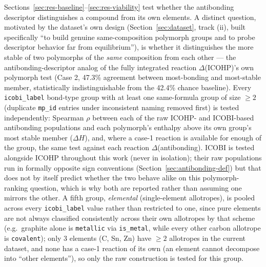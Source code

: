 \documentclass[journal=jpccck,manuscript=article]{achemso}
\begin{document}
Sections~\ref{sec:res-baseline}--\ref{sec:res-viability} test whether the
antibonding descriptor distinguishes a compound from its own elements. A
distinct question, motivated by the dataset's own design
(Section~\ref{sec:dataset}, track (ii), built specifically ``to build
genuine same-composition polymorph groups and to probe descriptor
behavior far from equilibrium''), is whether it distinguishes the more
stable of two polymorphs of the \emph{same} composition from each other
--- the antibonding-descriptor analog of the fully integrated reaction
$\Delta$(ICOHP)'s own polymorph test (Case 2, 47.3\% agreement between
most-bonding and most-stable member, statistically indistinguishable
from the 42.4\% chance baseline). Every \texttt{icobi\_label} bond-type
group with at least one same-formula group of size $\geq2$ (duplicate
\texttt{mp\_id} entries under inconsistent naming removed first) is
tested independently: Spearman $\rho$ between each of the raw ICOHP- and
ICOBI-based antibonding populations and each polymorph's enthalpy above
its own group's most stable member ($\Delta H$), and, where a case-1
reaction is available for enough of the group, the same test against
each reaction $\Delta$(antibonding). ICOBI is tested alongside ICOHP
throughout this work (never in isolation); their raw populations run in
formally opposite sign conventions (Section~\ref{sec:antibonding-def})
but that does not by itself predict whether the two behave alike on this
polymorph-ranking question, which is why both are reported rather than
assuming one mirrors the other. A fifth group, \emph{elemental}
(single-element allotropes), is pooled across every
\texttt{icobi\_label} value rather than restricted to one, since pure
elements are not always classified consistently across their own
allotropes by that scheme (e.g.\ graphite alone is \texttt{metallic} via
\texttt{is\_metal}, while every other carbon allotrope is
\texttt{covalent}); only 3 elements (C, Sn, Zn) have $\geq2$ allotropes
in the current dataset, and none has a case-1 reaction of its own (an
element cannot decompose into ``other elements''), so only the raw
construction is tested for this group.
\end{document}

